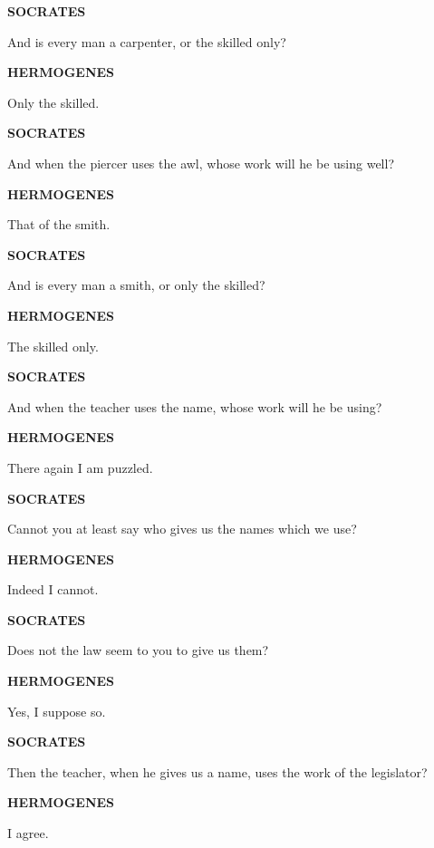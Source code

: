 \documentclass[11pt,letter]{article}
\begin{document}
\par \textbf{SOCRATES}
\par   And is every man a carpenter, or the skilled only?

\par \textbf{HERMOGENES}
\par   Only the skilled.

\par \textbf{SOCRATES}
\par   And when the piercer uses the awl, whose work will he be using well?

\par \textbf{HERMOGENES}
\par   That of the smith.

\par \textbf{SOCRATES}
\par   And is every man a smith, or only the skilled?

\par \textbf{HERMOGENES}
\par   The skilled only.

\par \textbf{SOCRATES}
\par   And when the teacher uses the name, whose work will he be using?

\par \textbf{HERMOGENES}
\par   There again I am puzzled.

\par \textbf{SOCRATES}
\par   Cannot you at least say who gives us the names which we use?

\par \textbf{HERMOGENES}
\par   Indeed I cannot.

\par \textbf{SOCRATES}
\par   Does not the law seem to you to give us them?

\par \textbf{HERMOGENES}
\par   Yes, I suppose so.

\par \textbf{SOCRATES}
\par   Then the teacher, when he gives us a name, uses the work of the legislator?

\par \textbf{HERMOGENES}
\par   I agree.
\end{document}

